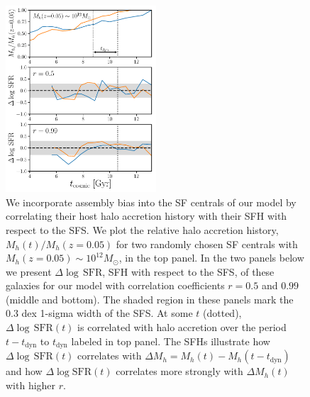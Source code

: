\documentclass[12pt, letterpaper, preprint, tighten]{aastex62}
\newcommand{\logsfr}{\log\mathrm{SFR}}
\begin{document}
\begin{figure}
\begin{center}
\includegraphics[width=0.5\textwidth]{figs/Mhacc_dSFR.pdf}
\caption{We incorporate assembly bias into the SF centrals of our model by
    correlating their host halo accretion history with their SFH with respect
    to the SFS. We plot the relative halo accretion history, $M_h(t)/M_h(z{=}0.05)$
    for two randomly chosen SF centrals with $M_h(z{=}0.05)\sim10^{12}M_\odot$,
    in the top panel. In the two panels below we present $\Delta\log\,\mathrm{SFR}$,
    SFH with respect to the SFS, of these galaxies for our model with correlation
    coefficients $r=0.5$ and $0.99$ (middle and bottom). The shaded region in these
    panels mark the $0.3$ dex 1-sigma width of the SFS. At some $t$ (dotted),
    $\Delta\log\,\mathrm{SFR}(t)$ is correlated with halo accretion over the
    period $t - t_\mathrm{dyn}$ to $t_\mathrm{dyn}$ labeled in top panel. The
    SFHs illustrate how $\Delta\log\,\mathrm{SFR}(t)$ correlates with
    $\Delta M_h = M_h(t) - M_h(t-t_\mathrm{dyn})$ and how $\Delta\logsfr(t)$
    correlates more strongly with $\Delta M_h(t)$ with higher $r$.}
\label{fig:mhacc_dsfr}
\end{center}
\end{figure}
\end{document}
